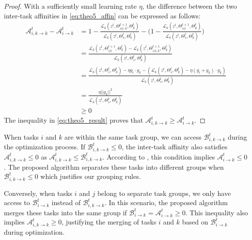 \begin{proof}
With a sufficiently small learning rate $\eta$, the difference between the two inter-task affinities in \cref{eq:theo5_affin} can be expressed as follows:
\begin{align}
    \mathcal{A}_{i,k \rightarrow k}^t - \mathcal{A}_{i\rightarrow k}^t &= 1-\frac{\mathcal{L}_k(z^t, \Theta_{s|i,k}^{t+1}, \Theta_k^{t})}{\mathcal{L}_k(z^t, \Theta_{s}^t, \Theta_k^{t})} - \biggr(1-\frac{\mathcal{L}_k(z^t, \Theta_{s|i}^{t+1}, \Theta_k^{t})}{\mathcal{L}_k(z^t, \Theta_{s}^t, \Theta_k^{t})}\biggr) \\
    &= \frac{\mathcal{L}_k(z^t, \Theta_{s|i}^{t+1}, \Theta_k^{t}) - \mathcal{L}_k(z^t, \Theta_{s|i,k}^{t+1}, \Theta_k^{t})}{\mathcal{L}_k(z^t, \Theta_{s}^t, \Theta_k^{t})}\\
    &= \frac{\mathcal{L}_k (z^t, \Theta_s^t, \Theta_k^t) - \eta g_i\cdot g_k - (\mathcal{L}_k (z^t, \Theta_s^t, \Theta_k^t) - \eta (g_i + g_k)\cdot g_k)}{\mathcal{L}_k(z^t, \Theta_{s}^t, \Theta_k^{t})}\\
    &= \frac{\eta||g_k||^2}{\mathcal{L}_k(z^t, \Theta_{s}^t, \Theta_k^{t})} \\
    &\geq 0
    \label{eq:theo5_result}
\end{align}
The inequality in \cref{eq:theo5_result} proves that $\mathcal{A}_{i,k \rightarrow k}^t \geq \mathcal{A}_{i \rightarrow k}^t$.
\end{proof}

When tasks $i$ and $k$ are within the same task group, we can access $\mathcal{B}_{i,k \rightarrow k}^t$ during the optimization process. If $\mathcal{B}_{i,k \rightarrow k}^t \leq 0$, the inter-task affinity also satisfies $\mathcal{A}_{i,k \rightarrow k}^t \leq 0$ as $\mathcal{A}_{i,k \rightarrow k}^t \leq \mathcal{B}_{i,k \rightarrow k}^t$. According to , this condition implies $\mathcal{A}_{i\rightarrow k}^t\leq 0$. The proposed algorithm separates these tasks into different groups when $\mathcal{B}_{i,k \rightarrow k}^t \leq 0$ which justifies our grouping rules.

Conversely, when tasks $i$ and $j$ belong to separate task groups, we only have access to $\mathcal{B}_{i \rightarrow k}^t$ instead of $\mathcal{B}_{i,k \rightarrow k}^t$. In this scenario, the proposed algorithm merges these tasks into the same group if $\mathcal{B}_{i \rightarrow k}^t = \mathcal{A}_{i \rightarrow k}^t \geq 0$. This inequality also implies $\mathcal{A}_{i,k\rightarrow k}^t\geq 0$, justifying the merging of tasks $i$ and $k$ based on $\mathcal{B}_{i \rightarrow k}^t$ during optimization.

